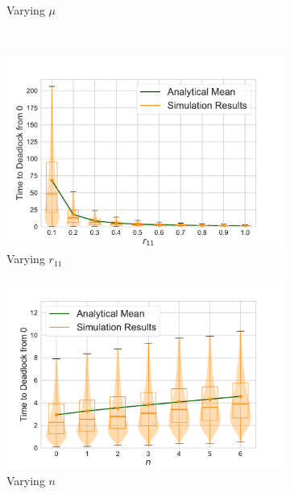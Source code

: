 \documentclass{article}
\numberwithin{equation}{section}
\begin{document}
\begin{figure}[!htbp]
\begin{center}
\begin{subfigure}[b]{0.48\textwidth}
    \caption{Varying $\mu$}
    \label{fig:1Nms_mu}
  \end{subfigure}\\
  \begin{subfigure}[b]{0.48\textwidth}
    \includegraphics[width=\textwidth]{images/1Nms_varyr11}
    \caption{Varying $r_{11}$}
    \label{fig:1Nms_r11}
  \end{subfigure}
  \begin{subfigure}[b]{0.48\textwidth}
    \includegraphics[width=\textwidth]{images/1Nms_varyn}
    \caption{Varying $n$}
    \label{fig:1Nms_n}
  \end{subfigure}\\
  \begin{subfigure}[b]{0.48\textwidth}

\end{subfigure}
\end{center}
\end{figure}
\end{document}
